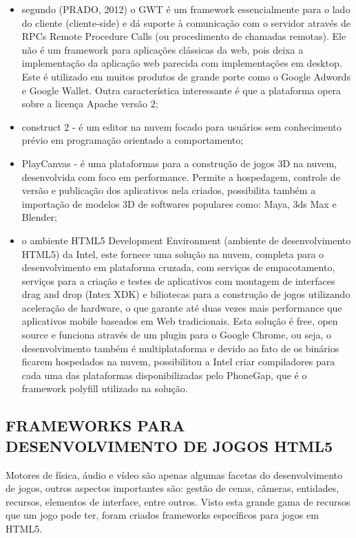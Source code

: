 \documentclass{article}
\begin{document}
\begin{itemize}

    \item segundo (PRADO, 2012) o GWT é um framework essencialmente para o lado do cliente (cliente-side) e dá suporte à comunicação com o servidor através de RPCs Remote Procedure Calls (ou procedimento de chamadas remotas). Ele não é um framework para aplicações clássicas da web, pois deixa a implementação da aplicação web parecida com implementações em desktop. Este é utilizado em muitos produtos de grande porte como o Google Adwords e Google Wallet. Outra característica interessante é que a plataforma opera sobre a licença Apache versão 2;
    \item construct 2 -  é um editor na nuvem focado para usuários sem conhecimento prévio em programação orientado a comportamento;
    \item PlayCanvas - é uma plataformas para a construção de jogos 3D na nuvem, desenvolvida com foco em performance. Permite a hospedagem, controle de versão e publicação dos aplicativos nela criados, possibilita também a importação de modelos 3D de softwares populares como: Maya, 3ds Max e Blender;
    \item o ambiente HTML5 Development Environment (ambiente de desenvolvimento HTML5) da Intel, este fornece uma solução na nuvem, completa para o desenvolvimento em plataforma cruzada, com serviços de empacotamento, serviços para a criação e testes de aplicativos com montagem de interfaces drag and drop (Intex XDK) e biliotecas para a construção de jogos utilizando aceleração de hardware, o que garante até duas vezes mais performance que aplicativos mobile baseados em Web tradicionais. Esta solução é free, open source e funciona  através de um plugin para o Google Chrome, ou seja, o desenvolvimento também é multiplataforma e devido ao fato de os binários ficarem hospedados na nuvem, possibilitou a  Intel criar compiladores para cada uma das plataformas disponibilizadas pelo PhoneGap, que é o framework polyfill utilizado na solução.
\end{itemize}



\subsection{FRAMEWORKS PARA DESENVOLVIMENTO DE JOGOS HTML5}

Motores de física, áudio e vídeo são apenas algumas facetas do desenvolvimento de jogos, outros aspectos importantes são: gestão de cenas, câmeras, entidades, recursos, elementos de interface, entre outros. Visto esta grande gama de recursos que um jogo pode ter, foram criados frameworks específicos para jogos em HTML5.
\end{document}

